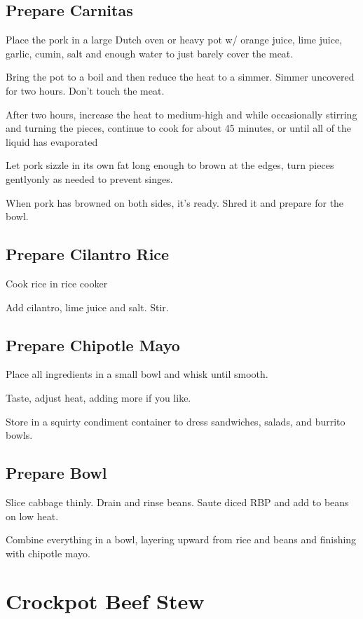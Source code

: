 \documentclass[letterpaper,10pt,english]{sphinxmanual}
\begin{document}
\section{Prepare Carnitas}
\label{\detokenize{Burrito_Bowl:prepare-carnitas}}
Place the pork in a large Dutch oven or heavy pot w/ orange juice, lime juice, garlic, cumin, salt and enough water to just barely cover the meat.

Bring the pot to a boil and then reduce the heat to a simmer. Simmer uncovered for two hours. Don’t touch the meat.

After two hours, increase the heat to medium-high and while occasionally stirring and turning the pieces, continue to cook for about 45 minutes, or until all of the liquid has evaporated

Let pork sizzle in its own fat long enough to brown at the edges, turn pieces gentlyonly as needed to prevent singes.

When pork has browned on both sides, it’s ready. Shred it and prepare for the bowl.


\section{Prepare Cilantro Rice}
\label{\detokenize{Burrito_Bowl:prepare-cilantro-rice}}
Cook rice in rice cooker

Add cilantro, lime juice and salt. Stir.


\section{Prepare Chipotle Mayo}
\label{\detokenize{Burrito_Bowl:prepare-chipotle-mayo}}
Place all ingredients in a small bowl and whisk until smooth.

Taste, adjust heat, adding more if you like.

Store in a squirty condiment container to dress sandwiches, salads, and burrito bowls.


\section{Prepare Bowl}
\label{\detokenize{Burrito_Bowl:prepare-bowl}}
Slice cabbage thinly.  Drain and rinse beans.  Saute diced RBP and add to beans on low heat.

Combine everything in a bowl, layering upward from rice and beans and finishing with chipotle mayo.


\chapter{Crockpot Beef Stew}
\label{\detokenize{Crockpot_Beef_Stew:crockpot-beef-stew}}\label{\detokenize{Crockpot_Beef_Stew::doc}}
\end{document}
